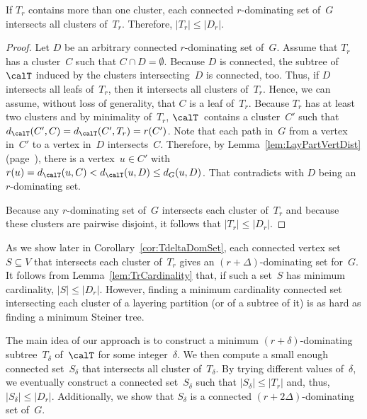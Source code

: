 \begin{lemma}
    \label{lem:TrCardinality}
If \( T_r \) contains more than one cluster, each connected \( r \)-dominating set of~\( G \) intersects all clusters of~\( T_r \).
Therefore, \( |T_r| \leq |D_r| \).
\end{lemma}

\begin{proof}
Let $D$ be an arbitrary connected $r$-dominating set of~$G$.
Assume that $T_r$ has a cluster~$C$ such that $C \cap D = \emptyset$.
Because $D$ is connected, the subtree of~$\calT$ induced by the clusters intersecting~$D$ is connected, too.
Thus, if $D$ intersects all leafs of~$T_r$, then it intersects all clusters of~$T_r$.
Hence, we can assume, without loss of generality, that $C$ is a leaf of~$T_r$.
Because $T_r$ has at least two clusters and by minimality of~$T_r$, $\calT$~contains a cluster~$C'$ such that $d_\calT(C', C) = d_\calT(C', T_r) = r(C')$.
Note that each path in~$G$ from a vertex in~$C'$ to a vertex in~$D$ intersects~$C$.
Therefore, by Lemma~\ref{lem:LayPartVertDist} (page~\pageref{lem:LayPartVertDist}), there is a vertex~$u \in C'$ with $r(u) = d_\calT(u, C) < d_\calT(u, D) \leq d_G(u, D)$.
That contradicts with $D$ being an $r$-dominating set.

Because any $r$-dominating set of~$G$ intersects each cluster of~$T_r$ and because these clusters are pairwise disjoint, it follows that $|T_r| \leq |D_r|$.
\end{proof}

As we show later in Corollary~\ref{cor:TdeltaDomSet}, each connected vertex set~$S \subseteq V$ that intersects each cluster of~$T_r$ gives an $(r + \Delta)$-dominating set for~$G$.
It follows from Lemma~\ref{lem:TrCardinality} that, if such a set~$S$ has minimum cardinality, $|S| \leq |D_r|$.
However, finding a minimum cardinality connected set intersecting each cluster of a layering partition (or of a subtree of it) is as hard as finding a minimum Steiner tree.

The main idea of our approach is to construct a minimum $(r + \delta)$-dominating subtree~$T_\delta$ of~$\calT$ for some integer~$\delta$.
We then compute a small enough connected set~$S_\delta$ that intersects all cluster of~$T_\delta$.
By trying different values of~$\delta$, we eventually construct a connected set~$S_\delta$ such that $|S_\delta| \leq |T_r|$ and, thus, $|S_\delta| \leq |D_r|$.
Additionally, we show that $S_\delta$ is a connected $(r + 2 \Delta)$-dominating set of~$G$.

